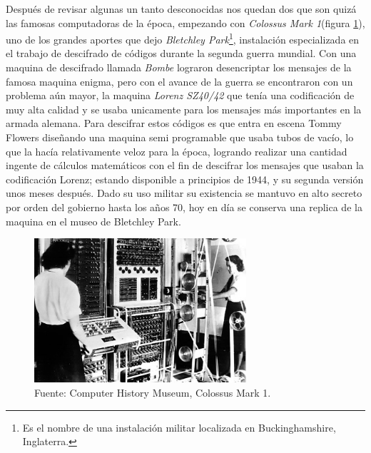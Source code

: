 \documentclass[letterpaper,12pt,oneside]{book}
\begin{document}
		
		Después de revisar algunas un tanto desconocidas nos quedan dos que son quizá las famosas computadoras de la época, empezando con 
		\textit{Colossus Mark 1}(figura \ref{fig:colossus}), uno de los grandes aportes que dejo \textit{Bletchley Park}\footnote{Es el nombre de una instalación militar localizada en Buckinghamshire, 	Inglaterra.}, instalación especializada en el trabajo de descifrado de códigos durante la segunda guerra mundial. Con una maquina de descifrado llamada \textit{Bombe}
		lograron desencriptar los mensajes de la famosa maquina enigma, pero con el avance de la guerra se encontraron con un problema aún mayor, la maquina
		\textit{Lorenz SZ40/42} que tenía una codificación de muy alta calidad y se usaba unicamente para los mensajes más importantes en la armada alemana. Para
		descifrar estos códigos es que entra en escena Tommy Flowers diseñando una maquina semi programable que usaba tubos de vacío, lo que la hacía
		relativamente veloz para la época, logrando realizar
		una cantidad ingente de cálculos matemáticos con el fin de descifrar los mensajes que usaban la codificación Lorenz; estando disponible a principios de 1944, y
		su segunda versión unos meses después. Dado su uso militar su existencia se mantuvo
		en alto secreto por orden del gobierno hasta los años 70, hoy en día se conserva una replica de la maquina en el museo de Bletchley Park\cite[p.39]{oregan_brief_2012}.
		
		\begin{figure}
		    \centering
		    \includegraphics[width=0.7\textwidth]{media/Historia/CHM_computers_1944.colossus.jpg}
		    \caption{Fuente: Computer History Museum, Colossus Mark 1.}
	    	\label{fig:colossus}
		\end{figure}
		
\end{document}
